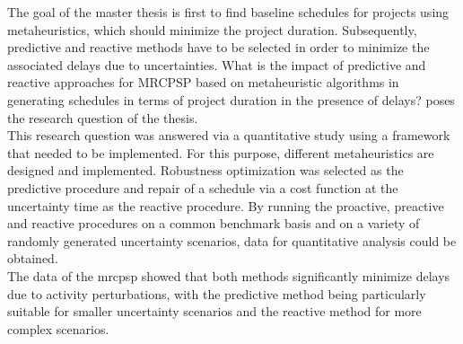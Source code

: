 The goal of the master thesis is first to find baseline schedules for projects using metaheuristics, which should minimize the project duration. Subsequently, predictive and reactive methods have to be selected in order to minimize the associated delays due to uncertainties. \glqq What is the impact of predictive and reactive approaches for MRCPSP based on metaheuristic algorithms in generating schedules in terms of project duration in the presence of delays?\grqq{} poses the research question of the thesis. \\

This research question was answered via a quantitative study using a framework that needed to be implemented. For this purpose, different metaheuristics are designed and implemented. Robustness optimization was selected as the predictive procedure and repair of a schedule via a cost function at the uncertainty time as the reactive procedure. By running the proactive, preactive and reactive procedures on a common benchmark basis and on a variety of randomly generated uncertainty scenarios, data for quantitative analysis could be obtained. \\

The data of the \acs{mrcpsp} showed that both methods significantly minimize delays due to activity perturbations, with the predictive method being particularly suitable for smaller uncertainty scenarios and the reactive method for more complex scenarios. 